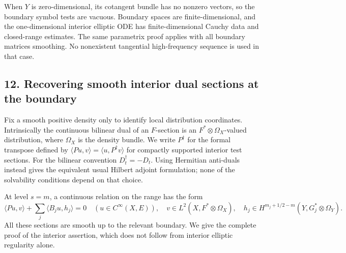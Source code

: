 \documentclass[
  11pt,
]{article}
\makeatletter
\let\ReaderOriginalAnchorStart\hyper@anchorstart
\let\ReaderOriginalAnchorEnd\hyper@anchorend
\let\ReaderPendingAliases\@empty
\def\ReaderArmAliases#1{\gdef\ReaderPendingAliases{#1}}
\def\hyper@anchorstart#1{\ReaderIfNativeAnchorTF{#1}{\ReaderPendingAliases\global\let\ReaderPendingAliases\@empty}{}\ReaderOriginalAnchorStart{#1}}
\makeatother
\begin{document}
When \(Y\) is zero-dimensional, its cotangent bundle has no nonzero
vectors, so the boundary symbol tests are vacuous. Boundary spaces are
finite-dimensional, and the one-dimensional interior elliptic ODE has
finite-dimensional Cauchy data and closed-range estimates. The same
parametrix proof applies with all boundary matrices smoothing. No
nonexistent tangential high-frequency sequence is used in that case.

\ReaderArmAliases{\ReaderOriginalAnchorStart{AN03-GFB-012}\ReaderOriginalAnchorEnd\begingroup\expandafter\def\csname @currentHref\endcsname{AN03-GFB-012}\label{AN03-GFB-012}\endgroup\ReaderOriginalAnchorStart{an03-gfb-012-recovering-smooth-interior-dual-sections-at-the-boundary}\ReaderOriginalAnchorEnd\begingroup\expandafter\def\csname @currentHref\endcsname{an03-gfb-012-recovering-smooth-interior-dual-sections-at-the-boundary}\label{an03-gfb-012-recovering-smooth-interior-dual-sections-at-the-boundary}\endgroup\ReaderOriginalAnchorStart{12-recovering-smooth-interior-dual-sections-at-the-boundary}\ReaderOriginalAnchorEnd\begingroup\expandafter\def\csname @currentHref\endcsname{12-recovering-smooth-interior-dual-sections-at-the-boundary}\label{12-recovering-smooth-interior-dual-sections-at-the-boundary}\endgroup\ReaderOriginalAnchorStart{recovering-smooth-interior-dual-sections-at-the-boundary}\ReaderOriginalAnchorEnd}
\subsection{12. Recovering smooth interior dual sections at the
boundary}\label{recovering-smooth-interior-dual-sections-at-the-boundary}

Fix a smooth positive density only to identify local distribution
coordinates. Intrinsically the continuous bilinear dual of an
\(F\)-section is an \(F^*\otimes\Omega_X\)-valued distribution, where
\(\Omega_X\) is the density bundle. We write \(P^\dagger\) for the
formal transpose defined by
\(\langle Pu,v\rangle=\langle u,P^\dagger v\rangle\) for compactly
supported interior test sections. For the bilinear convention
\(D_t^\dagger=-D_t\). Using Hermitian anti-duals instead gives the
equivalent usual Hilbert adjoint formulation; none of the solvability
conditions depend on that choice.

At level \(s=m\), a continuous relation on the range has the form \[
 \langle Pu,v\rangle+\sum_j\langle B_ju,h_j\rangle=0
 \quad(u\in C^\infty(X,E)),
 \quad v\in L^2(X,F^*\otimes\Omega_X),\quad
 h_j\in H^{m_j+1/2-m}(Y,G_j^*\otimes\Omega_Y).
 \tag{BF37}
\] All these sections are smooth up to the relevant boundary. We give
the complete proof of the interior assertion, which does not follow from
interior elliptic regularity alone.
\end{document}
